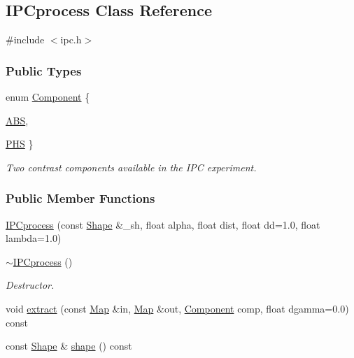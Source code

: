 \hypertarget{classIPCprocess}{
\subsection{IPCprocess Class Reference}
\label{classIPCprocess}
}


{\ttfamily \#include $<$ipc.h$>$}

\subsubsection*{Public Types}
\begin{DoxyCompactItemize}
\item 
enum \hyperlink{classIPCprocess_a9e159369437f40cc3340171a0f6d3418}{Component} \{ \par
\hyperlink{classIPCprocess_a9e159369437f40cc3340171a0f6d3418a540b36da226dad86da1395d70355f98c}{ABS}, 
\par
\hyperlink{classIPCprocess_a9e159369437f40cc3340171a0f6d3418aafcace9e0a0649cf8e5ff4378c6c15bb}{PHS}
 \}
\begin{DoxyCompactList}\small\item\em Two contrast components available in the IPC experiment. \item\end{DoxyCompactList}\end{DoxyCompactItemize}
\subsubsection*{Public Member Functions}
\begin{DoxyCompactItemize}
\item 
\hyperlink{classIPCprocess_aece870d357e17745d9eb342f08a84c41}{IPCprocess} (const \hyperlink{group__Types_ga777964671cb4315ce8c56c920db031e3}{Shape} \&\_\-sh, float alpha, float dist, float dd=1.0, float lambda=1.0)
\item 
\hyperlink{classIPCprocess_a40a4264b5978fe7e68d716df8ad9370f}{$\sim$IPCprocess} ()
\begin{DoxyCompactList}\small\item\em Destructor. \item\end{DoxyCompactList}\item 
void \hyperlink{classIPCprocess_a72709800e5e016684a23e0ad7538d7fd}{extract} (const \hyperlink{group__Types_ga8747378c016fc11d9ecbb98787248c25}{Map} \&in, \hyperlink{group__Types_ga8747378c016fc11d9ecbb98787248c25}{Map} \&out, \hyperlink{classIPCprocess_a9e159369437f40cc3340171a0f6d3418}{Component} comp, float dgamma=0.0) const 
\item 
const \hyperlink{group__Types_ga777964671cb4315ce8c56c920db031e3}{Shape} \& \hyperlink{classIPCprocess_a33a2bcc7299ba410578e25c963d7cf5b}{shape} () const 
\end{DoxyCompactItemize}
